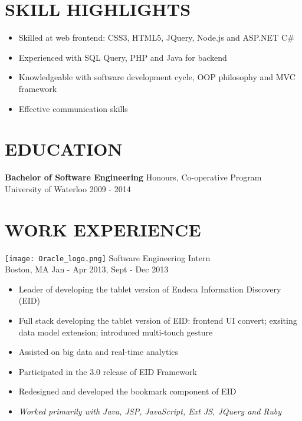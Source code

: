 \documentclass[line,margin]{res}
\begin{document}

\address{
{\it (+1)226 929 2310}
\ \ \ \ \ 
\href{mailto:mollylyb@gmail.com}{\it mollylyb@gmail.com} 
\ \ \ \ \ 
\href{http://mollybing.github.com}{\it mollybing.github.com}
}
 
\begin{resume}
 
\section{\uppercase{skill highlights}}
\begin{itemize}
\item Skilled at web frontend: CSS3, HTML5, JQuery, Node.js and ASP.NET C\#
\item Experienced with SQL Query, PHP and Java for backend
\item Knowledgeable with software development cycle, OOP philosophy and MVC framework
\item Effective communication skills
\end{itemize}

 
\section{\uppercase{Education}}
{\bf Bachelor of Software Engineering} \hfill Honours, Co-operative Program \\
University of Waterloo \hfill 2009 - 2014

\section{\uppercase{work Experience}}
\texttt{[image: Oracle\_logo.png]} \hfill Software Engineering Intern \\
Boston, MA \hfill Jan - Apr 2013, Sept - Dec 2013
\begin{itemize}
\item Leader of developing the tablet version of Endeca Information Discovery (EID)
\item Full stack developing the tablet version of EID: frontend UI convert; exsiting data model extension; introduced multi-touch gesture
\item Assisted on big data and real-time analytics
\item Participated in the 3.0 release of EID Framework
\item Redesigned and developed the bookmark component of EID
\item {\it Worked primarily with Java, JSP, JavaScript, Ext JS, JQuery and Ruby}
\end{itemize} 
 

\end{resume}
\end{document}

